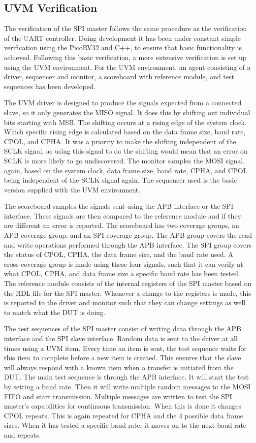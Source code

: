 \documentclass[./dissertation.tex]{subfiles}
\begin{document}
\subsection{UVM Verification}
The verification of the SPI master follows the same procedure as the verification of the UART controller. Doing development it has been under constant simple verification using the PicoRV32 and C++, to ensure that basic functionality is achieved. Following this basic verification, a more extensive verification is set up using the UVM environment. For the UVM environment, an agent consisting of a driver, sequencer and monitor, a scoreboard with reference module, and test sequences has been developed. 

The UVM driver is designed to produce the signals expected from a connected slave, so it only generates the MISO signal. It does this by shifting out individual bits starting with MSB. The shifting occurs at a rising edge of the system clock. Which specific rising edge is calculated based on the data frame size, baud rate, CPOL, and CPHA. It was a priority to make the shifting independent of the SCLK signal, as using this signal to do the shifting would mean that an error on SCLK is more likely to go undiscovered. The monitor samples the MOSI signal, again, based on the system clock, data frame size, baud rate, CPHA, and CPOL being independent of the SCLK signal again. The sequencer used is the basic version supplied with the UVM environment.

The scoreboard samples the signals sent using the APB interface or the SPI interface. These signals are then compared to the reference module and if they are different an error is reported. The scoreboard has two coverage groups, an APB coverage group, and an SPI coverage group. The APB group covers the read and write operations performed through the APB interface. The SPI group covers the status of CPOL, CPHA, the data frame size, and the baud rate used. A cross-coverage group is made using these four signals, such that it can verify at what CPOL, CPHA, and data frame size a specific baud rate has been tested. The reference module consists of the internal registers of the SPI master based on the RDL file for the SPI master. Whenever a change to the registers is made, this is reported to the driver and monitor such that they can change settings as well to match what the DUT is doing. 

The test sequences of the SPI master consist of writing data through the APB interface and the SPI slave interface. Random data is sent to the driver at all times using a UVM item. Every time an item is sent, the test sequence waits for this item to complete before a new item is created. This ensures that the slave will always respond with a known item when a transfer is initiated from the DUT. The main test sequence is through the APB interface. It will start the test by setting a baud rate. Then it will write multiple random messages to the MOSI FIFO and start transmission. Multiple messages are written to test the SPI master's capabilities for continuous transmission. When this is done it changes CPOL repeats. This is again repeated for CPHA and the 4 possible data frame sizes. When it has tested a specific baud rate, it moves on to the next baud rate and repeats. 
\end{document}
